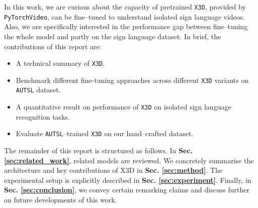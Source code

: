 In this work, we are curious about the capacity of pretrained \texttt{X3D}, provided by \texttt{PyTorchVideo}, can be fine–tuned to understand isolated sign language videos.
Also, we are specifically interested in the performance gap between fine–tuning the whole model and partly on the sign language dataset.
In brief, the contributions of this report are:

\begin{itemize}
    \item A technical summary of \texttt{X3D}.
    \item Benchmark different fine-tuning approaches across different \texttt{X3D} variants on \texttt{AUTSL} dataset.
    \item A quantitative result on performance of \texttt{X3D} on isolated sign language recognition tasks.
    \item Evaluate \texttt{AUTSL}–trained \texttt{X3D} on our hand–crafted dataset.
\end{itemize}

The remainder of this report is structured as follows. In \textbf{Sec. \ref{sec:related_work}}, related models are reviewed. We concretely summarise the architecture and key contributions of X3D in \textbf{Sec. \ref{sec:method}}.
The experimental setup is explicitly described in \textbf{Sec. \ref{sec:experiment}}. Finally, in \textbf{Sec. \ref{sec:conclusion}}, we convey certain remarking claims and discuss further on future developments of this work.